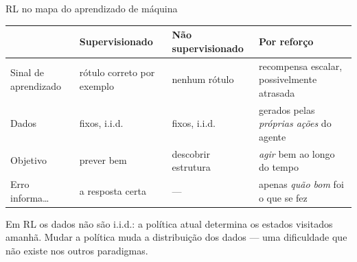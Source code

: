 \documentclass[aspectratio=169, 11pt]{beamer}
\begin{document}
\begin{frame}{RL no mapa do aprendizado de máquina}
  \begin{center}
  \footnotesize
  \begin{tabular}{@{}p{2.6cm}p{3.4cm}p{3.4cm}p{3.8cm}@{}}
    \toprule
      & \textbf{Supervisionado} & \textbf{Não supervisionado} & \textbf{Por reforço} \\
    \midrule
    Sinal de aprendizado & rótulo correto por exemplo & nenhum rótulo &
      recompensa escalar, possivelmente atrasada \\
    Dados & fixos, i.i.d. & fixos, i.i.d. &
      gerados pelas \emph{próprias ações} do agente \\
    Objetivo & prever bem & descobrir estrutura &
      \emph{agir} bem ao longo do tempo \\
    Erro informa\ldots & a resposta certa & — &
      apenas \emph{quão bom} foi o que se fez \\
    \bottomrule
  \end{tabular}
  \end{center}

  \begin{alertabox}
    Em RL os dados não são i.i.d.: a política atual determina os estados
    visitados amanhã. Mudar a política muda a distribuição dos dados — uma
    dificuldade que não existe nos outros paradigmas.
  \end{alertabox}
\end{frame}
\end{document}
